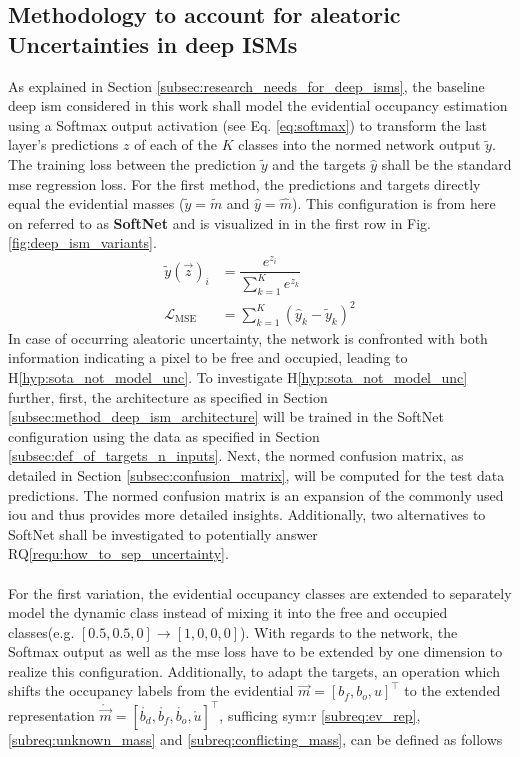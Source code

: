 \subsection{Methodology to account for aleatoric Uncertainties in deep ISMs}
\label{subsec:method_al_uncert_in_deep_isms}
As explained in Section \ref{subsec:research_needs_for_deep_isms}, the baseline deep \gls{ism} considered in this work shall model the evidential occupancy estimation using a Softmax output activation (see Eq. \ref{eq:softmax}) to transform the last layer's predictions $z$ of each of the $K$ classes into the normed network output $\tilde{y}$. The training loss between the prediction $\tilde{y}$ and the targets $\hat{y}$ shall be the standard \gls{mse} regression loss. For the first method, the predictions and targets directly equal the evidential masses ($\tilde{y} = \tilde{m}$ and $\hat{y} = \hat{m}$). This configuration is from here on referred to as \textbf{SoftNet} and is visualized in in the first row in Fig. \ref{fig:deep_ism_variants}. 
\begin{align}
	\label{eq:softmax}
	\tilde{y}(\vec{z})_i &= \dfrac{e^{z_i}}{\sum_{k=1}^{K}e^{z_k}}\\
	\label{eq:mse}
	\mathcal{L}_{\text{MSE}} &= \sum_{k=1}^{K}(\hat{y}_k - \tilde{y}_k)^2
\end{align}
In case of occurring aleatoric uncertainty, the network is confronted with both information indicating a pixel to be free and occupied, leading to H\ref{hyp:sota_not_model_unc}. To investigate H\ref{hyp:sota_not_model_unc} further, first, the architecture as specified in Section \ref{subsec:method_deep_ism_architecture} will be trained in the SoftNet configuration using the data as specified in Section \ref{subsec:def_of_targets_n_inputs}. Next, the normed confusion matrix, as detailed in Section \ref{subsec:confusion_matrix}, will be computed for the test data predictions. The normed confusion matrix is an expansion of the commonly used \gls{iou} and thus provides more detailed insights. Additionally, two alternatives to SoftNet shall be investigated to potentially answer RQ\ref{requ:how_to_sep_uncertainty}. 
\\\\
For the first variation, the evidential occupancy classes are extended to separately model the dynamic class instead of mixing it into the free and occupied classes(e.g. $[0.5, 0.5,0] \rightarrow [1,0,0,0]$). With regards to the network, the Softmax output as well as the \gls{mse} loss have to be extended by one dimension to realize this configuration. Additionally, to adapt the targets, an operation which shifts the occupancy labels from the evidential $\vec{m}=[b_f,b_o,u]^\top$ to the extended representation $\mathring{\vec{m}}=[\mathring{b_d},\mathring{b_f},\mathring{b_o},\mathring{u}]^\top$, sufficing \gls{sym:r} \ref{subreq:ev_rep}, \ref{subreq:unknown_mass} and \ref{subreq:conflicting_mass}, can be defined as follows
